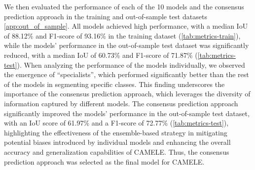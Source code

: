 We then evaluated the performance of each of the 10 models and the consensus
prediction approach in the training and out-of-sample test datasets
\cref{app:out_of_sample}. All models
achieved high performance, with a median IoU of 88.12\% and F1-score of
93.16\% in the training dataset (\cref{tab:metrics-train}), while the
models'
performance in the out-of-sample test dataset was significantly reduced, with a
median IoU of 60.73\% and F1-score of 71.87\% (\cref{tab:metrics-test}). When
analyzing the performance of the models individually, we observed the
emergence of ``specialists'', which performed significantly better than the
rest of the models in segmenting specific classes. This finding underscores the
importance of the consensus prediction approach, which leverages the diversity
of information captured by different models. The consensus prediction approach
significantly improved the models' performance in the out-of-sample test
dataset, with an IoU score of 61.97\% and a F1-score of 72.77\%
(\cref{tab:metrics-test}), highlighting the effectiveness of the
ensemble-based strategy in mitigating potential biases introduced by individual
models and enhancing the overall accuracy and generalization capabilities of
CAMELE. Thus, the consensus prediction approach was selected as the final
model for CAMELE.